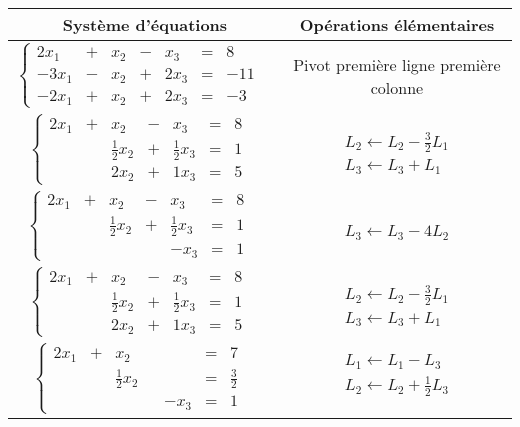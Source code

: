 \documentclass[a4paper]{book}
\begin{document}
\begin{Exemple}
\begin{center}
\begin{tabular}{c|c}
Système d'équations&	Opérations élémentaires	\\\hline
$\left\{\begin{matrix}2x_1&+&x_2&-&x_3&=&8&\\-3x_1&-&x_2&+&2x_3&=&-11&\\-2x_1&+&x_2&+&2x_3&=&-3&\end{matrix}\right.$&Pivot première ligne première colonne\\\hline
$\left\{\begin{matrix}2x_1&+&x_2&-&x_3&=&8&\\&&\frac 1 2x_2&+&\frac 1 2x_3&=&1&\\&&2x_2&+&1x_3&=&5&\end{matrix}\right.$&$\left.\begin{matrix}\\L_2\leftarrow L_2-\frac 3 2 L_1\\ L_3\leftarrow L_3+ L_1 \end{matrix}\right.$\\\hline
$\left\{\begin{matrix}2x_1&+&x_2&-&x_3&=&8&\\&&\frac 1 2x_2&+&\frac 1 2x_3&=&1&\\&&&&-x_3&=&1&\end{matrix}\right.$&$\left.\begin{matrix}\\\\ L_3\leftarrow L_3-4 L_2 \end{matrix}\right.$\\\hline
$\left\{\begin{matrix}2x_1&+&x_2&-&x_3&=&8&\\&&\frac 1 2x_2&+&\frac 1 2x_3&=&1&\\&&2x_2&+&1x_3&=&5&\end{matrix}\right.$&$\left.\begin{matrix}\\L_2\leftarrow L_2-\frac 3 2 L_1\\ L_3\leftarrow L_3+ L_1 \end{matrix}\right.$\\\hline
$\left\{\begin{matrix}2x_1&+&x_2&&&=&7&\\&&\frac 1 2x_2&&&=&\frac 3 2&\\&&&&-x_3&=&1&\end{matrix}\right.$&$\left.\begin{matrix}L_1\leftarrow L_1- L_3\\L_2\leftarrow L_2+\frac 1 2 L_3\\  \end{matrix}\right.$\\\hline

\end{tabular}
\end{center}
\end{Exemple}
\end{document}
